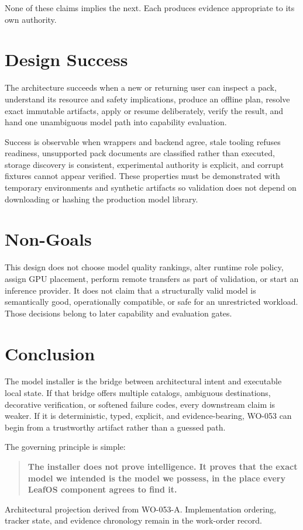 \documentclass[11pt]{article}
\begin{document}
None of these claims implies the next. Each produces evidence appropriate to
its own authority.

\section{Design Success}

The architecture succeeds when a new or returning user can inspect a pack,
understand its resource and safety implications, produce an offline plan,
resolve exact immutable artifacts, apply or resume deliberately, verify the
result, and hand one unambiguous model path into capability evaluation.

Success is observable when wrappers and backend agree, stale tooling refuses
readiness, unsupported pack documents are classified rather than executed,
storage discovery is consistent, experimental authority is explicit, and
corrupt fixtures cannot appear verified. These properties must be demonstrated
with temporary environments and synthetic artifacts so validation does not
depend on downloading or hashing the production model library.

\section{Non-Goals}

This design does not choose model quality rankings, alter runtime role policy,
assign GPU placement, perform remote transfers as part of validation, or start
an inference provider. It does not claim that a structurally valid model is
semantically good, operationally compatible, or safe for an unrestricted
workload. Those decisions belong to later capability and evaluation gates.

\section{Conclusion}

The model installer is the bridge between architectural intent and executable
local state. If that bridge offers multiple catalogs, ambiguous destinations,
decorative verification, or softened failure codes, every downstream claim is
weaker. If it is deterministic, typed, explicit, and evidence-bearing, WO-053
can begin from a trustworthy artifact rather than a guessed path.

The governing principle is simple:

\begin{quote}
\color{leafgreen}\bfseries
The installer does not prove intelligence. It proves that the exact model we
intended is the model we possess, in the place every LeafOS component agrees to
find it.
\end{quote}

\vfill
\begin{center}
\small\color{leafgray}
Architectural projection derived from WO-053-A. Implementation ordering,
tracker state, and evidence chronology remain in the work-order record.
\end{center}
\end{document}
